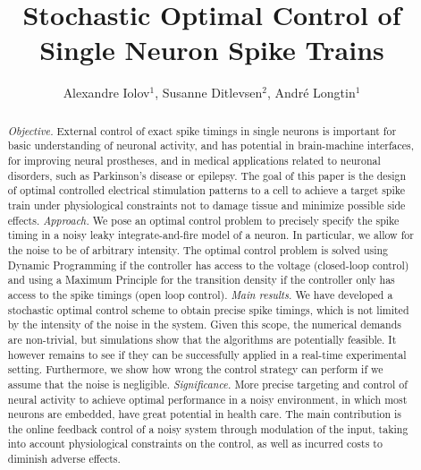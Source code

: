 \documentclass[12pt]{iopart}
\begin{document}
 


\title{Stochastic Optimal Control of Single Neuron Spike Trains}
\author{Alexandre Iolov$^1$, Susanne Ditlevsen$^2$, Andr\'e Longtin$^1$
		}	
\address{%
     (1) Department of Mathematics and Statistics, University of Ottawa, Ottawa,
    Canada
\\
    (2) Department of Mathematical Sciences, University of Copenhagen,
Copenhagen, Denmark
}


\begin{abstract}

{\em Objective.} External control of exact spike timings in single neurons is
important for basic understanding of neuronal activity, and has potential in
brain-machine interfaces, for improving neural prostheses, and in medical
applications related to neuronal disorders, such as Parkinson's disease or
epilepsy. The goal of this paper is the design of optimal controlled electrical
stimulation patterns to a cell to achieve a target spike train under
physiological constraints not to damage tissue and minimize possible side
effects. {\em Approach.} We pose an optimal control problem to precisely specify
the spike timing in a noisy leaky integrate-and-fire model of a neuron. In
particular, we allow for the noise to be of arbitrary intensity. The optimal
control problem is solved using Dynamic Programming if the controller has access
to the voltage (closed-loop control) and using a Maximum Principle for the
transition density if the controller only has access to the spike timings (open
loop control). {\em Main results.} We have developed a stochastic optimal
control scheme to obtain precise spike timings, which is not limited by the
intensity of the noise in the system. Given this scope, the numerical demands
are non-trivial, but simulations show that the algorithms are potentially
feasible. It however remains to see if they can be successfully applied in a
real-time experimental setting. Furthermore, we show how wrong the control
strategy can perform if we assume that the noise is negligible. {\em
Significance.} More precise targeting and control of neural activity to achieve
optimal performance in a noisy environment, in which most neurons are embedded,
have great potential in health care. The main contribution is the online
feedback control of a noisy system through modulation of the input, taking into
account physiological constraints on the control, as well as incurred costs to
diminish adverse effects.

\end{abstract}
\end{document}
